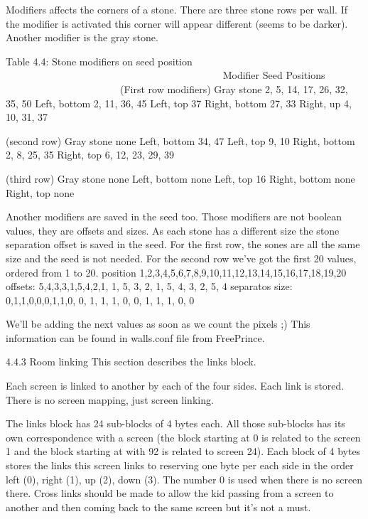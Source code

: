  Modifiers affects the corners of a stone. There are three stone rows per
 wall. If the modifier is activated this corner will appear different
 (seems to be darker). Another modifier is the gray stone.

                   Table 4.4: Stone modifiers on seed position
                   ~~~~~~~~~~~~~~~~~~~~~~~~~~~~~~~~~~~~~~~~~~~
  Modifier       Seed Positions
	~~~~~~~~       ~~~~ ~~~~~~~~~
     (First row modifiers)
  Gray stone     2, 5, 14, 17, 26, 32, 35, 50
  Left, bottom   2, 11, 36, 45
  Left, top      37
  Right, bottom  27, 33
  Right, up      4, 10, 31, 37

     (second row)
  Gray stone     none 
  Left, bottom   34, 47
  Left, top      9, 10
  Right, bottom  2, 8, 25, 35
  Right, top     6, 12, 23, 29, 39

     (third row)
  Gray stone     none 
  Left, bottom   none
  Left, top      16
  Right, bottom  none
  Right, top     none

 Another modifiers are saved in the seed too. Those modifiers are not
 boolean values, they are offsets and sizes. As each stone has a different
 size the stone separation offset is saved in the seed.
 For the first row, the sones are all the same size and the seed is not
 needed.
 For the second row we've got the first 20 values, ordered from 1 to 20. 
 position        1,2,3,4,5,6,7,8,9,10,11,12,13,14,15,16,17,18,19,20
 offsets:        5,4,3,3,1,5,4,2,1, 1, 5, 3, 2, 1, 5, 4, 3, 2, 5, 4
 separatos size: 0,1,1,0,0,0,1,1,0, 0, 1, 1, 1, 0, 0, 1, 1, 1, 0, 0

 We'll be adding the next values as soon as we count the pixels ;)
 This information can be found in walls.conf file from FreePrince.

4.4.3 Room linking
 This section describes the links block.

 Each screen is linked to another by each of the four sides. Each link
 is stored. There is no screen mapping, just screen linking.

 The links block has 24 sub-blocks of 4 bytes each. All those sub-blocks
 has its own correspondence with a screen (the block starting at 0 is
 related to the screen 1 and the block starting at with 92 is related to
 screen 24).
 Each block of 4 bytes stores the links this screen links to reserving one
 byte per each side in the order left (0), right (1), up (2), down (3).
 The number 0 is used when there is no screen there.
 Cross links should be made to allow the kid passing from a screen to
 another and then coming back to the same screen but it's not a must.

